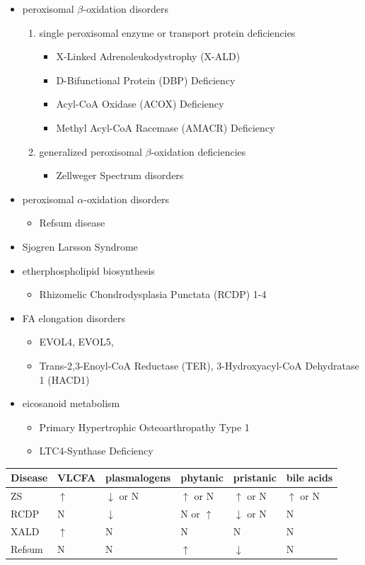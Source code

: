 \documentclass{scrartcl}
\begin{document}
\begin{itemize}
\item peroxisomal \(\beta\)-oxidation disorders
\begin{enumerate}
\item single peroxisomal enzyme or transport protein deficiencies
\begin{itemize}
\item X-Linked Adrenoleukodystrophy (X-ALD)
\item D-Bifunctional Protein (DBP) Deficiency
\item Acyl-CoA Oxidase (ACOX) Deficiency
\item Methyl Acyl-CoA Racemase (AMACR) Deficiency
\end{itemize}
\item generalized peroxisomal \(\beta\)-oxidation deficiencies
\begin{itemize}
\item Zellweger Spectrum disorders
\end{itemize}
\end{enumerate}
\item peroxisomal \(\alpha\)-oxidation disorders
\begin{itemize}
\item Refsum disease
\end{itemize}
\item Sjogren Larsson Syndrome
\item etherphospholipid biosynthesis
\begin{itemize}
\item Rhizomelic Chondrodysplasia Punctata (RCDP) 1-4
\end{itemize}
\item FA elongation disorders
\begin{itemize}
\item EVOL4, EVOL5,
\item Trans-2,3-Enoyl-CoA Reductase (TER), 3-Hydroxyacyl-CoA Dehydratase 1 (HACD1)
\end{itemize}
\item eicosanoid metabolism
\begin{itemize}
\item Primary Hypertrophic Osteoarthropathy Type 1
\item LTC4-Synthase Deficiency
\end{itemize}
\end{itemize}


\begin{center}
\begin{tabular}{llllll}
Disease & VLCFA & plasmalogens & phytanic & pristanic & bile acids\\
\hline
ZS & \(\uparrow\) & \(\downarrow\) or N & \(\uparrow\) or N & \(\uparrow\) or N & \(\uparrow\) or N\\
RCDP & N & \(\downarrow\) & N or \(\uparrow\) & \(\downarrow\) or N & N\\
XALD & \(\uparrow\) & N & N & N & N\\
Refsum & N & N & \(\uparrow\) & \(\downarrow\) & N\\
\end{tabular}
\end{center}
\end{document}
